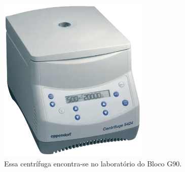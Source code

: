 \documentclass[
  letterpaper,
  DIV=11,
  numbers=noendperiod]{scrreprt}
\begin{document}
\begin{figure}

{\centering \includegraphics[width=\textwidth,height=3.125in]{figures/equipamentos/Centrifuga_Eppendorf_5424_2.png}

}

\caption{Essa centrífuga encontra-se no laboratório do Bloco G90.}

\end{figure}
\end{document}
